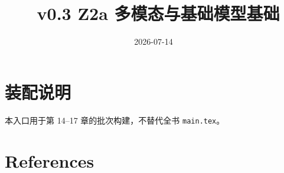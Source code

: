 \documentclass[UTF8,a4paper,12pt,openany]{ctexbook}
\title{\ReportTitle\ v0.3 Z2a 多模态与基础模型基础}
\author{\ReportAuthor}
\date{2026-07-14}
\begin{document}
\frontmatter
\maketitle
\chapter*{装配说明}
本入口用于第 14--17 章的批次构建，不替代全书 \texttt{main.tex}。
\tableofcontents

\mainmatter
\setcounter{chapter}{13}





\backmatter
\chapter{References}
\printbibliography[heading=none]
\end{document}
